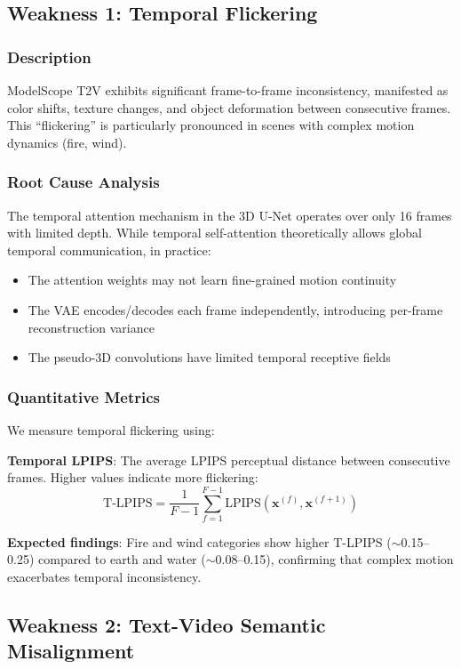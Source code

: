 \documentclass[conference]{IEEEtran}
\begin{document}
\subsection{Weakness 1: Temporal Flickering}

\subsubsection{Description}
ModelScope T2V exhibits significant frame-to-frame inconsistency, manifested as color shifts, texture changes, and object deformation between consecutive frames. This ``flickering'' is particularly pronounced in scenes with complex motion dynamics (fire, wind).

\subsubsection{Root Cause Analysis}
The temporal attention mechanism in the 3D U-Net operates over only 16 frames with limited depth. While temporal self-attention theoretically allows global temporal communication, in practice:
\begin{itemize}
    \item The attention weights may not learn fine-grained motion continuity
    \item The VAE encodes/decodes each frame independently, introducing per-frame reconstruction variance
    \item The pseudo-3D convolutions have limited temporal receptive fields
\end{itemize}

\subsubsection{Quantitative Metrics}
We measure temporal flickering using:

\textbf{Temporal LPIPS}: The average LPIPS \cite{zhang2018lpips} perceptual distance between consecutive frames. Higher values indicate more flickering:
\begin{equation}
    \text{T-LPIPS} = \frac{1}{F-1} \sum_{f=1}^{F-1} \text{LPIPS}(\mathbf{x}^{(f)}, \mathbf{x}^{(f+1)})
\end{equation}

\textbf{Expected findings}: Fire and wind categories show higher T-LPIPS ($\sim$0.15--0.25) compared to earth and water ($\sim$0.08--0.15), confirming that complex motion exacerbates temporal inconsistency.

\subsection{Weakness 2: Text-Video Semantic Misalignment}
\end{document}

